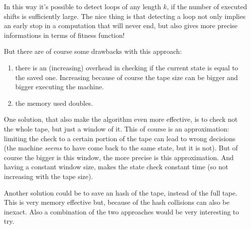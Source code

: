 \documentclass{report}
\begin{document}
In this way it's possible to detect loops of any length $k$, if the number of executed shifts is sufficiently large. The nice thing is that detecting a loop not only implies an early stop in a computation that will never end, but also gives more precise informations in terms of fitness function!

But there are of course some drawbacks with this approach:
\begin{enumerate}
\item there is an (increasing) overhead in checking if the current state is equal to the saved one. Increasing because of course the tape size can be bigger and bigger executing the machine.
\item the memory used doubles.
\end{enumerate}

One solution, that also make the algorithm even more effective, is to check not the whole tape, but just a window of it. This of course is an approximation: limiting the check to a certain portion of the tape can lead to wrong decisions (the machine \textit{seems} to have come back to the same state, but it is not).
But of course the bigger is this window, the more precise is this approximation. And having a constant window size, makes the state check constant time (so not increasing with the tape size).

Another solution could be to save an hash of the tape, instead of the full tape. This is very memory effective but, because of the hash collisions can also be inexact. Also a combination of the two approaches would be very interesting to try.




\end{document}
